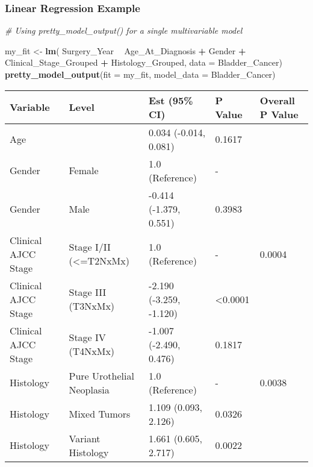 \documentclass[table]{article}
\newenvironment{Shaded}{\begin{snugshade}}{\end{snugshade}}
\newcommand{\CommentTok}[1]{\textcolor[rgb]{0.56,0.35,0.01}{\textit{#1}}}
\newcommand{\DataTypeTok}[1]{\textcolor[rgb]{0.13,0.29,0.53}{#1}}
\newcommand{\KeywordTok}[1]{\textcolor[rgb]{0.13,0.29,0.53}{\textbf{#1}}}
\newcommand{\NormalTok}[1]{#1}
\newcommand{\OperatorTok}[1]{\textcolor[rgb]{0.81,0.36,0.00}{\textbf{#1}}}
\newcommand{\StringTok}[1]{\textcolor[rgb]{0.31,0.60,0.02}{#1}}
\begin{document}
\clearpage

\hypertarget{linear-regression-example}{%
\subsubsection{Linear Regression
Example}\label{linear-regression-example}}

\begin{Shaded}
\begin{Highlighting}[]
\CommentTok{# Using pretty_model_output() for a single multivariable model}

\NormalTok{my_fit <-}\StringTok{ }\KeywordTok{lm}\NormalTok{(}
\NormalTok{  Surgery_Year }\OperatorTok{~}\StringTok{ }\NormalTok{Age_At_Diagnosis }\OperatorTok{+}\StringTok{ }\NormalTok{Gender }\OperatorTok{+}\StringTok{ }\NormalTok{Clinical_Stage_Grouped }\OperatorTok{+}\StringTok{ }
\StringTok{    }\NormalTok{Histology_Grouped, }\DataTypeTok{data =}\NormalTok{ Bladder_Cancer)}
\KeywordTok{pretty_model_output}\NormalTok{(}\DataTypeTok{fit =}\NormalTok{ my_fit, }\DataTypeTok{model_data =}\NormalTok{ Bladder_Cancer)}
\end{Highlighting}
\end{Shaded}

\begin{tabular}{l|l|l|l|l}
\hline
Variable & Level & Est (95\% CI) & P Value & Overall P Value\\
\hline
Age &  & 0.034 (-0.014, 0.081) & 0.1617 & \\
\hline
Gender & Female & 1.0 (Reference) & - & \\
\hline
Gender & Male & -0.414 (-1.379, 0.551) & 0.3983 & \\
\hline
Clinical AJCC Stage & Stage I/II (<=T2NxMx) & 1.0 (Reference) & - & 0.0004\\
\hline
Clinical AJCC Stage & Stage III (T3NxMx) & -2.190 (-3.259, -1.120) & <0.0001 & \\
\hline
Clinical AJCC Stage & Stage IV (T4NxMx) & -1.007 (-2.490, 0.476) & 0.1817 & \\
\hline
Histology & Pure Urothelial Neoplasia & 1.0 (Reference) & - & 0.0038\\
\hline
Histology & Mixed Tumors & 1.109 (0.093, 2.126) & 0.0326 & \\
\hline
Histology & Variant Histology & 1.661 (0.605, 2.717) & 0.0022 & \\
\hline
\end{tabular}
\end{document}
